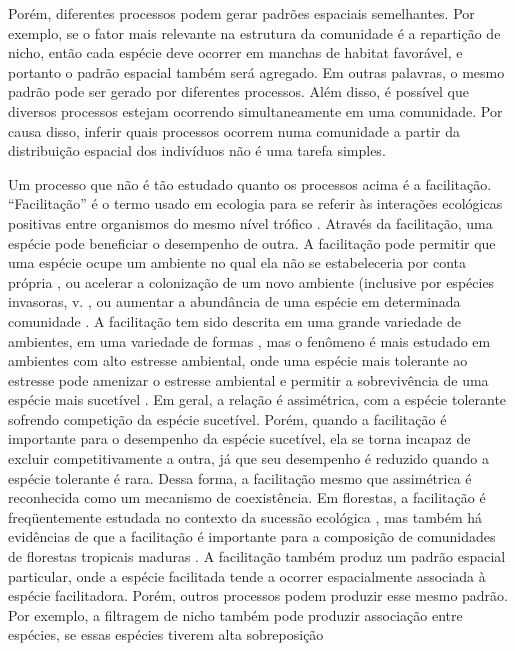 \documentclass[twoside,12pt,a4paper]{report}
\begin{document}
Porém, diferentes processos podem gerar padrões espaciais semelhantes. Por exemplo, se o
fator mais relevante na estrutura da comunidade é a repartição de nicho, então cada espécie
deve ocorrer em manchas de habitat favorável, e portanto o padrão espacial também será
agregado. Em outras palavras, o mesmo padrão pode ser gerado por diferentes processos. Além
disso, é possível que diversos processos estejam ocorrendo simultaneamente em uma comunidade.
Por causa disso, inferir quais processos ocorrem numa comunidade a partir da distribuição
espacial dos indivíduos não é uma tarefa simples.

Um processo que não é tão estudado quanto os processos acima é a facilitação.
“Facilitação” é o termo usado em ecologia para se referir às interações ecológicas positivas entre
organismos do mesmo nível trófico \citep{Pakeman2009}. 
Através da facilitação, uma espécie pode beneficiar o desempenho de outra. 
A facilitação pode permitir que uma
espécie ocupe um ambiente no qual ela não se estabeleceria por conta própria \citep{Lortie2004},
ou acelerar a colonização de um novo ambiente (inclusive por espécies invasoras, v.
\citep{Wundrow2012}, ou aumentar a abundância de uma espécie em determinada comunidade \citep{Alados2006}.
A facilitação tem sido descrita em uma grande variedade de ambientes, em
uma variedade de formas \citep{McIntire2014}, mas o fenômeno é mais estudado em ambientes com
alto estresse ambiental, onde uma espécie mais tolerante ao estresse pode amenizar o estresse ambiental e
permitir a sobrevivência de uma espécie mais sucetível \citep{BertnessHacker1994,
BertnessCallaway1994,Brooker2008}. Em geral, a relação é assimétrica, com a espécie tolerante
sofrendo competição da espécie sucetível. Porém, quando a facilitação é importante para o
desempenho da espécie sucetível, ela se torna incapaz de excluir competitivamente a outra, já
que seu desempenho é reduzido quando a espécie tolerante é rara. Dessa forma, a facilitação
mesmo que assimétrica é reconhecida como um mecanismo de coexistência.
Em florestas, a facilitação é freqüentemente
estudada no contexto da sucessão ecológica \citep{refs refs refs}, mas também há evidências de que a facilitação é importante para a composição de
comunidades de florestas tropicais maduras
\citep{Ledo2015}.
A facilitação também produz um padrão espacial particular, onde a espécie facilitada tende a
ocorrer espacialmente associada à espécie facilitadora.
Porém, outros processos podem produzir esse mesmo padrão. Por exemplo, a filtragem de nicho
também pode produzir associação entre espécies, se essas espécies tiverem alta sobreposição
\end{document}
